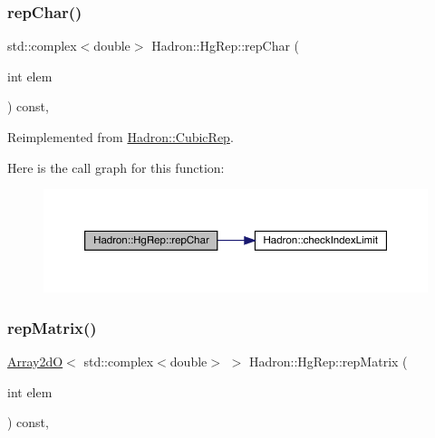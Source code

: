 \subsubsection{\texorpdfstring{repChar()}{repChar()}\hspace{0.1cm}{\footnotesize\ttfamily [2/2]}}
{\footnotesize\ttfamily std\+::complex$<$double$>$ Hadron\+::\+Hg\+Rep\+::rep\+Char (\begin{DoxyParamCaption}\item[{int}]{elem }\end{DoxyParamCaption}) const\hspace{0.3cm}{\ttfamily [inline]}, {\ttfamily [virtual]}}



Reimplemented from \mbox{\hyperlink{structHadron_1_1CubicRep_af45227106e8e715e84b0af69cd3b36f8}{Hadron\+::\+Cubic\+Rep}}.

Here is the call graph for this function\+:
\nopagebreak
\begin{figure}[H]
\begin{center}
\leavevmode
\includegraphics[width=350pt]{d5/d3a/structHadron_1_1HgRep_a49537241226a4b230d73e72cb1a21de3_cgraph}
\end{center}
\end{figure}
\mbox{\label{structHadron_1_1HgRep_a1ca0a9c28a8e0a9aba561029b7e61f08}} 
\subsubsection{\texorpdfstring{repMatrix()}{repMatrix()}\hspace{0.1cm}{\footnotesize\ttfamily [1/2]}}
{\footnotesize\ttfamily \mbox{\hyperlink{classADAT_1_1Array2dO}{Array2dO}}$<$ std\+::complex$<$double$>$ $>$ Hadron\+::\+Hg\+Rep\+::rep\+Matrix (\begin{DoxyParamCaption}\item[{int}]{elem }\end{DoxyParamCaption}) const\hspace{0.3cm}{\ttfamily [inline]}, {\ttfamily [virtual]}}



